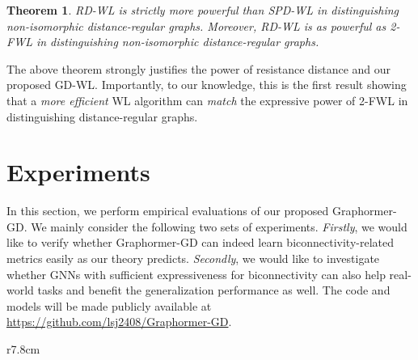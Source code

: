 \documentclass{article}
\newtheorem{theorem}{Theorem}[section]
\begin{document}
\begin{theorem}
\label{thm:distance_regular_maintext}
    RD-WL is strictly more powerful than SPD-WL in distinguishing non-isomorphic distance-regular graphs. Moreover, RD-WL is as powerful as 2-FWL in distinguishing non-isomorphic distance-regular graphs.
\end{theorem}

The above theorem strongly justifies the power of resistance distance and our proposed GD-WL. Importantly, to our knowledge, this is the first result showing that a \emph{more efficient} WL algorithm can \emph{match} the expressive power of 2-FWL in distinguishing distance-regular graphs.

\section{Experiments}
\label{sec:experiments}

In this section, we perform empirical evaluations of our proposed Graphormer-GD. We mainly consider the following two sets of experiments. \emph{Firstly}, we would like to verify whether Graphormer-GD can indeed learn biconnectivity-related metrics easily as our theory predicts. \emph{Secondly}, we would like to investigate whether GNNs with sufficient expressiveness for biconnectivity can also help real-world tasks and benefit the generalization performance as well. The code and models will be made publicly available at \url{https://github.com/lsj2408/Graphormer-GD}.

\begin{wraptable}{r}{7.8cm}
\vspace{-20pt}
\caption{Accuracy on cut vertex (articulation point) and cut edge (bridge) detection tasks.}
  \vspace{4px}
  \label{tab:syn}
  \centering
\vspace{-8pt}
\end{wraptable}
\end{document}
